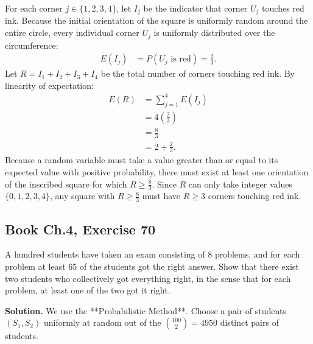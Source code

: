 \documentclass[11pt,a4paper]{article}
\begin{document}
For each corner $j \in \{1, 2, 3, 4\}$, let $I_j$ be the indicator that corner $U_j$ touches red ink. Because the initial orientation of the square is uniformly random around the entire circle, every individual corner $U_j$ is uniformly distributed over the circumference:
\begin{align*}
E(I_j) &= P(U_j \text{ is red}) = \frac{2}{3}.
\end{align*}
Let $R = I_1 + I_2 + I_3 + I_4$ be the total number of corners touching red ink. By linearity of expectation:
\begin{align*}
E(R) &= \sum_{j=1}^{4} E(I_j) \\
&= 4 \left(\frac{2}{3}\right) \\
&= \frac{8}{3} \\
&= 2 + \frac{2}{3}.
\end{align*}
Because a random variable must take a value greater than or equal to its expected value with positive probability, there must exist at least one orientation of the inscribed square for which $R \ge \frac{8}{3}$. Since $R$ can only take integer values $\{0, 1, 2, 3, 4\}$, any square with $R \ge \frac{8}{3}$ must have $R \ge 3$ corners touching red ink.

\vspace{10pt}
\subsection{Book Ch.4, Exercise 70}
\begin{tcolorbox}[title={Book Ch.4, Exercise 70}]
A hundred students have taken an exam consisting of 8 problems, and for each problem at least 65 of the students got the right answer. Show that there exist two students who collectively got everything right, in the sense that for each problem, at least one of the two got it right.
\end{tcolorbox}

\noindent \textbf{Solution.} We use the **Probabilistic Method**. Choose a pair of students $(S_1, S_2)$ uniformly at random out of the $\binom{100}{2} = 4950$ distinct pairs of students. 
\end{document}
